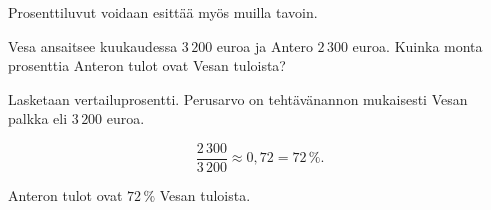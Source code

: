 \begin{esimerkki}
    Prosenttiluvut voidaan esittää myös muilla tavoin.
\end{esimerkki}


\begin{esimerkki}
Vesa ansaitsee kuukaudessa $3\,200$ euroa ja Antero $2\,300$ euroa. Kuinka monta prosenttia Anteron tulot ovat Vesan tuloista? 
    
	\begin{esimratk}
    Lasketaan vertailuprosentti. Perusarvo on tehtävänannon mukaisesti Vesan palkka eli $3\,200$ euroa.
    
    \[
        \frac{2\,300}{3\,200} 
        \approx 0,72
        = 72\,\%.
    \]
    \end{esimratk}
    
  \begin{esimvast}
Anteron tulot ovat $72\,\%$ Vesan tuloista.
  \end{esimvast}
\end{esimerkki}


